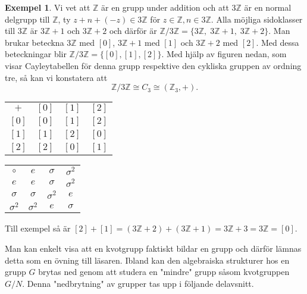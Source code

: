 \documentclass{article}
\theoremstyle{definition}
\newtheorem{exmp}[thm]{Exempel}
\begin{document}
\begin{exmp}
  Vi vet att $\mathbb{Z}$ är en grupp under addition och att $3 \mathbb{Z}$ är en normal delgrupp till $\mathbb{Z}$, ty $z + n + (-z) \in 3 \mathbb{Z}$
  för $z \in \mathbb{Z}, n \in 3 \mathbb{Z}$. Alla möjliga sidoklasser till $3 \mathbb{Z}$ är $3 \mathbb{Z} + 1$ och $3 \mathbb{Z} + 2$ och därför är 
  $\mathbb{Z} / 3\mathbb{Z} = \{3 \mathbb{Z}, \; 3 \mathbb{Z} + 1, \; 3 \mathbb{Z} + 2\}$. Man brukar beteckna $3 \mathbb{Z}$ med $[0]$, 
  $3 \mathbb{Z} + 1$ med $[1]$ och $3 \mathbb{Z} + 2$ med $[2]$. Med dessa beteckningar blir $\mathbb{Z} / 3\mathbb{Z} = \{[0], [1], [2]\}$. 
  Med hjälp av figuren 
  nedan, som visar Cayleytabellen för denna grupp respektive den cykliska gruppen av ordning tre, så kan vi konstatera att
  \[\mathbb{Z} / 3\mathbb{Z} \cong C_3 \cong (\mathbb{Z}_3, +).\]
  \begin{center}
    \begin{tabular}{c | c c c}
      $+$ & $[0]$ & $[1]$ & $[2]$  \\
      \cline{1-4}
      $[0]$ & $[0]$ & $[1]$ & $[2]$ \\
      $[1]$ & $[1]$  & $[2]$ & $[0]$\\
      $[2]$ & $[2]$ & $[0]$  & $[1]$\\
    \end{tabular} 
    \qquad
    \begin{tabular}{c | c c c}
      $\circ$ & $e$ & $\sigma$ & $\sigma^2$ \\
      \cline{1-4}
      $e$ & $e$ & $\sigma$ & $\sigma^2$ \\
      $\sigma$ & $\sigma$ & $\sigma^2$  & $e$\\
      $\sigma^2$ & $\sigma^2$ & $e$ & $\sigma$
    \end{tabular}
  \end{center}
  Till exempel så är $[2] + [1] = (3 \mathbb{Z} + 2) + (3 \mathbb{Z} + 1) = 3\mathbb{Z} + 3 = 3 \mathbb{Z} = [0].$
\end{exmp}
Man kan enkelt visa att en kvotgrupp faktiskt bildar en grupp och därför lämnas detta som en övning till läsaren. Ibland kan den 
algebraiska strukturer hos en grupp $G$ brytas ned genom att studera en "mindre" grupp såsom kvotgruppen $G/N$. Denna "nedbrytning"
av grupper tas upp i följande delavsnitt.
\end{document}
